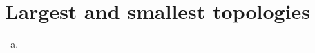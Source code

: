 \section{Largest and smallest topologies}
\label{exercises:01-A}

\begin{enumerate}[(a)]
  \item
\end{enumerate}
